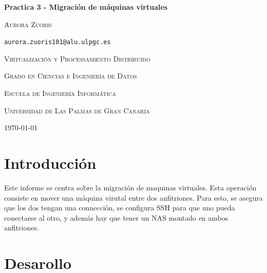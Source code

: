 \documentclass[spanish]{article}
\begin{document}
\begin{titlepage}
	\centering
	{\huge\bfseries Practica 3 - Migración de máquinas virtuales \par}
	\vspace{1cm}
	{\scshape\Large Aurora Zuoris \par\tt{aurora.zuoris101@alu.ulpgc.es}\par}
	\vspace{3cm}
	{\scshape\large Virtualización y Processamiento Distribuido\par}
	\vspace{1cm}
	{\scshape\large Grado en Ciencias e Ingeniería de Datos\par}
	\vspace{1cm}
	{\scshape\large Escuela de Ingeniería Informática\par}
	\vspace{1cm}
	{\scshape\large Universidad de Las Palmas de Gran Canaria\par}
	\vspace{1cm}
	{\scshape\large \today{} \par}
\end{titlepage}

\newpage

\tableofcontents

\newpage

\section{Introducción}


Este informe se centra sobre la migración de maquinas virtuales.
Esta operación consiste en mover una máquina virutal entre dos anfitriones.
Para esto, se asegura que los dos tengan una connección, se configura SSH para que uno pueda
conectarse al otro, y además hay que tener un NAS montado en ambos anfitriones.

\section{Desarollo}
\end{document}
